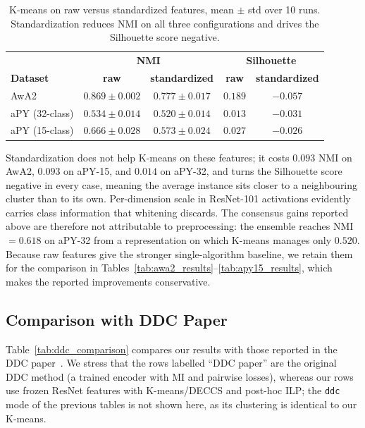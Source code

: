\begin{table}[H]
    \centering
    \caption{K-means on raw versus standardized features, mean $\pm$ std over 10 runs.
    Standardization reduces NMI on all three configurations and drives the Silhouette
    score negative.}
    \label{tab:standardization_ablation}
    \begin{tabular}{lcccc}
        \hline
        & \multicolumn{2}{c}{\textbf{NMI}} & \multicolumn{2}{c}{\textbf{Silhouette}} \\
        \textbf{Dataset} & \textbf{raw} & \textbf{standardized} & \textbf{raw} & \textbf{standardized} \\
        \hline
        AwA2 & $0.869 \pm 0.002$ & $0.777 \pm 0.017$ & $0.189$ & $-0.057$ \\
        aPY (32-class) & $0.534 \pm 0.014$ & $0.520 \pm 0.014$ & $0.013$ & $-0.031$ \\
        aPY (15-class) & $0.666 \pm 0.028$ & $0.573 \pm 0.024$ & $0.027$ & $-0.026$ \\
        \hline
    \end{tabular}
\end{table}


Standardization does not help K-means on these features; it costs $0.093$ NMI on
AwA2, $0.093$ on aPY-15, and $0.014$ on aPY-32, and turns the Silhouette score
negative in every case, meaning the average instance sits closer to a neighbouring
cluster than to its own. Per-dimension scale in ResNet-101 activations evidently
carries class information that whitening discards. The consensus gains reported
above are therefore not attributable to preprocessing: the ensemble reaches
NMI $= 0.618$ on aPY-32 from a representation on which K-means manages only
$0.520$. Because raw features give the stronger single-algorithm baseline, we
retain them for the comparison in Tables~\ref{tab:awa2_results}--\ref{tab:apy15_results},
which makes the reported improvements conservative.


\subsection{Comparison with DDC Paper}
\label{sec:ddc_comparison}

Table~\ref{tab:ddc_comparison} compares our results with those reported in the DDC paper~\citep{Zhang2021}. We stress that the rows labelled ``DDC paper'' are the original DDC method (a trained encoder with MI and pairwise losses), whereas our rows use frozen ResNet features with K-means/DECCS and post-hoc ILP; the \texttt{ddc} mode of the previous tables is not shown here, as its clustering is identical to our K-means.

